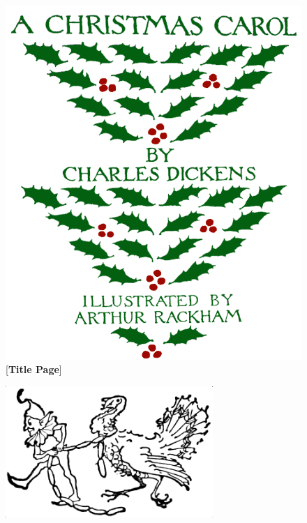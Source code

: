 \documentclass[
paper=5.5in:8.5in,
BCOR=7mm,
twoside,
DIV=calc,
fontsize=12pt,
usegeometry,
dottedtocline,
headers=normal,
listof=numbered,
listof=totoc,
listof=flat,
listof=nochaptergap]{scrbook} %
\begin{document}
\frontmatter
\renewcommand*{\sectionmarkformat}{}

\renewcommand*\raggedchapter{\centering}
\pagestyle{empty}
\begin{figure}[p]
\begin{minipage}[c]{\linewidth}
\includegraphics[width=\linewidth]{newaccfront}
[\textbf{Title Page}]{}
\end{minipage}
\end{figure}
\thispagestyle{empty}


\pagestyle{plain}

\tableofcontents
\vfill
\begin{figure}[h!]
\centering
\includegraphics[width=0.7\textwidth]{elfturkey}
\caption[Tailpiece to Table of Contents]{}
\end{figure}
\clearpage
\end{document}
